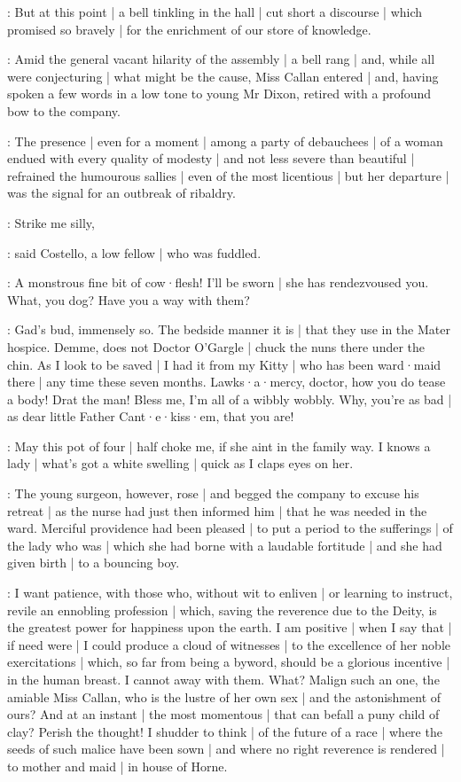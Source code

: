 :
But at this point |
a bell tinkling in the hall |
cut short a discourse |
which promised so bravely |
for the enrichment of our store of knowledge.



:
Amid the general vacant hilarity of the assembly |
a bell rang |
and,
while all were conjecturing |
what might be the cause,
Miss Callan entered |
and,
having spoken a few words in a low tone to young Mr Dixon,
retired with a profound bow to the company.

:
The presence |
even for a moment |
among a party of debauchees |
of a woman endued with every quality of modesty |
and not less severe than beautiful |
refrained the humourous sallies |
even of the most licentious |
but her departure |
was the signal for an outbreak of ribaldry.

\punch:
Strike me silly,

:
said Costello,
a low fellow |
who was fuddled.

\punch:
A monstrous fine bit of cow·flesh!
I'll be sworn |
she has rendezvoused you.
What,
you dog?
Have you a way with them?

\lynch:
Gad's bud,
immensely so.
The bedside manner it is |
that they use in the Mater hospice.
Demme,
does not Doctor O'Gargle |
chuck the nuns there under the chin.
As I look to be saved |
I had it from my Kitty |
who has been ward·maid there |
any time these seven months.
Lawks·a·mercy,
doctor,
how you do tease a body!
Drat the man!
Bless me,
I'm all of a wibbly
wobbly.
Why,
you're as bad |
as dear little Father Cant·e·kiss·em,
that you are!

\punch:
May this pot of four |
half choke me,
if she aint in the family way.
I knows a lady |
what's got a white swelling |
quick as I claps eyes on her.

:
The young surgeon,
however,
rose |
and begged the company to excuse his retreat |
as the nurse had just then informed him |
that he was needed in the ward.
Merciful providence had been pleased |
to put a period to the sufferings |
of the lady who was  |
which she had borne with a laudable fortitude |
and she had given birth |
to a bouncing boy.

\dixon:
I want patience,
with those who,
without wit to enliven |
or learning to instruct,
revile an ennobling profession |
which,
saving the reverence due to the Deity,
is the greatest power for happiness upon the earth.
I am positive |
when I say that |
if need were |
I could produce a cloud of witnesses |
to the excellence of her noble exercitations |
which,
so far from being a byword,
should be a glorious incentive |
in the human breast.
I cannot away with them.
What?
Malign such an one,
the amiable Miss Callan,
who is the lustre of her own sex |
and the astonishment of ours?
And at an instant |
the most momentous |
that can befall a puny child of clay?
Perish the thought!
I shudder to think |
of the future of a race |
where the seeds of such malice have been sown |
and where no right reverence is rendered |
to mother and maid |
in house of Horne.


